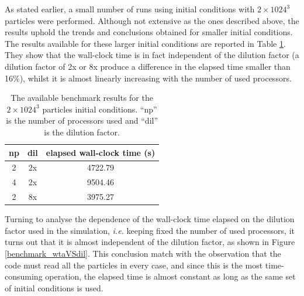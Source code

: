 \documentclass[11pt,a4paper,titlepage]{article}
\newcommand{\virg}[1]{``{#1}''}
\newcommand{\ie}{\emph{i.e.}\xspace}
\begin{document}
As stated earlier, a small number of runs using initial conditions with $2 \times 1024^3$ particles were performed. Although not extensive as the ones described above, the results uphold the trends and conclusions obtained for smaller initial conditions. The results available for these larger initial conditions are reported in Table \ref{Tab_1024}. They show that the wall-clock time is in fact independent of the dilution factor (a dilution factor of 2x or 8x produce a difference in the elapsed time smaller than 16\%), whilst it is almost linearly increasing with the number of used processors.

\begin{table}[!h]
\centering
\begin{tabular}{cc|c}
np & dil                  & elapsed wall-clock time (s) \\
\hline
2  & 2x  & 4722.79 \\
4  & 2x  & 9504.46 \\
2  & 8x  & 3975.27 \\
\end{tabular}
\caption{The available benchmark results for the $2 \times 1024^3$ particles initial conditions. \virg{np} is the number of processors used and \virg{dil} is the dilution factor.}
\label{Tab_1024}
\end{table}

Turning to analyse the dependence of the wall-clock time elapsed on the dilution factor used in the simulation, \ie keeping fixed the number of used processors, it turns out that it is almost independent of the dilution factor, as shown in Figure \ref{benchmark_wtaVSdil}. This conclusion match with the observation that the code must read all the particles in every case, and since this is the most time-consuming operation, the elapsed time is almost constant as long as the same set of initial conditions is used.
\end{document}
